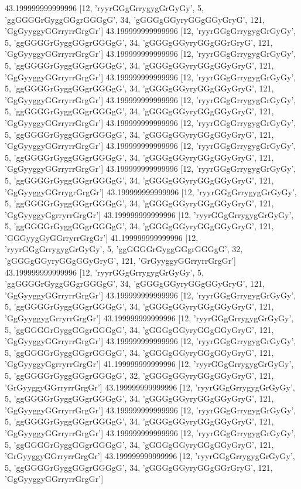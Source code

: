 43.199999999999996 [12, 'ryyrGGgGrrygygGrGyGy', 5, 'ggGGGGrGyggGGgrGGGgG', 34, 'gGGGgGGyryGGgGGyGryG', 121, 'GgGyyggyGGrryrrGrgGr']
43.199999999999996 [12, 'ryyrGGgGrrygygGrGyGy', 5, 'ggGGGGrGyggGGgrGGGgG', 34, 'gGGGgGGyryGGgGGrGryG', 121, 'GgGyyggyGGrryrrGrgGr']
43.199999999999996 [12, 'ryyrGGgGrrygygGrGyGy', 5, 'ggGGGGrGyggGGgrGGGgG', 34, 'gGGGgGGyryGGgGGyGryG', 121, 'GgGyyggyGGrryrrGrgGr']
43.199999999999996 [12, 'ryyrGGgGrrygygGrGyGy', 5, 'ggGGGGrGyggGGgrGGGgG', 34, 'gGGGgGGyryGGgGGyGryG', 121, 'GgGyyggyGGrryrrGrgGr']
43.199999999999996 [12, 'ryyrGGgGrrygygGrGyGy', 5, 'ggGGGGrGyggGGgrGGGgG', 34, 'gGGGgGGyryGGgGGyGryG', 121, 'GgGyyggyGGrryrrGrgGr']
43.199999999999996 [12, 'ryyrGGgGrrygygGrGyGy', 5, 'ggGGGGrGyggGGgrGGGgG', 34, 'gGGGgGGyryGGgGGyGryG', 121, 'GgGyyggyGGrryrrGrgGr']
43.199999999999996 [12, 'ryyrGGgGrrygygGrGyGy', 5, 'ggGGGGrGyggGGgrGGGgG', 34, 'gGGGgGGyryGGgGGyGryG', 121, 'GgGyyggyGGrryrrGrgGr']
43.199999999999996 [12, 'ryyrGGgGrrygygGrGyGy', 5, 'ggGGGGrGyggGGgrGGGgG', 34, 'gGGGgGGyryGGgGGyGryG', 121, 'GgGyyggyGGrrygrGrgGr']
43.199999999999996 [12, 'ryyrGGgGrrygygGrGyGy', 5, 'ggGGGGrGyggGGgrGGGgG', 34, 'gGGGgGGyryGGgGGyGryG', 121, 'GgGyyggyGgrryrrGrgGr']
43.199999999999996 [12, 'ryyrGGgGrrygygGrGyGy', 5, 'ggGGGGrGyggGGgrGGGgG', 34, 'gGGGgGGyryGGgGGyGryG', 121, 'GGGyygGyGGrryrrGrgGr']
41.199999999999996 [12, 'ryyrGGgGrrygygGrGyGy', 5, 'ggGGGGrGyggGGgrGGGgG', 32, 'gGGGgGGyryGGgGGyGryG', 121, 'GrGyyggyGGrryrrGrgGr']
43.199999999999996 [12, 'ryyrGGgGrrygygGrGyGy', 5, 'ggGGGGrGyggGGgrGGGgG', 34, 'gGGGgGGyryGGgGGyGryG', 121, 'GgGyyggyGGrryrrGrgGr']
43.199999999999996 [12, 'ryyrGGgGrrygygGrGyGy', 5, 'ggGGGGrGyggGGgrGGGgG', 34, 'gGGGgGGyryGGgGGyGryG', 121, 'GgGyyggygGrryrrGrgGr']
43.199999999999996 [12, 'ryyrGGgGrrygygGrGyGy', 5, 'ggGGGGrGyggGGgrGGGgG', 34, 'gGGGgGGyryGGgGGyGryG', 121, 'GgGyyggyGGrryrrGrgGr']
43.199999999999996 [12, 'ryyrGGgGrrygygGrGyGy', 5, 'ggGGGGrGyggGGgrGGGgG', 34, 'gGGGgGGyryGGgGGyGryG', 121, 'GgGyyggyGgrryrrGrgGr']
41.199999999999996 [12, 'ryyrGGgGrrygygGrGyGy', 5, 'ggGGGGrGyggGGgrGGGgG', 32, 'gGGGgGGyryGGgGGyGryG', 121, 'GrGyyggyGGrryrrGrgGr']
43.199999999999996 [12, 'ryyrGGgGrrygygGrGyGy', 5, 'ggGGGGrGyggGGgrGGGgG', 34, 'gGGGgGGyryGGgGGyGryG', 121, 'GgGyyggyGGrryrrGrgGr']
43.199999999999996 [12, 'ryyrGGgGrrygygGrGyGy', 5, 'ggGGGGrGyggGGgrGGGgG', 34, 'gGGGgGGyryGGgGGyGryG', 121, 'GgGyyggyGGrryrrGrgGr']
43.199999999999996 [12, 'ryyrGGgGrrygygGrGyGy', 5, 'ggGGGGrGyggGGgrGGGgG', 34, 'gGGGgGGyryGGgGGyGryG', 121, 'GrGyyggyGGrryrrGrgGr']
43.199999999999996 [12, 'ryyrGGgGrrygygGrGyGy', 5, 'ggGGGGrGyggGGgrGGGgG', 34, 'gGGGgGGyryGGgGGrGryG', 121, 'GgGyyggyGGrryrrGrgGr']

